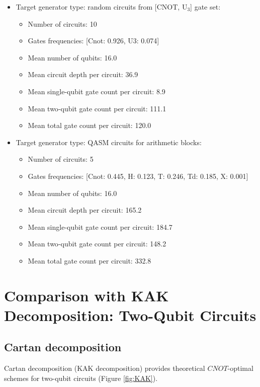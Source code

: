 \documentclass{report}%
\begin{document}
\begin{itemize}%
\item%
Target generator type: random circuits from [CNOT, U$_3$] gate set:%
\begin{itemize}%
\item%
Number of circuits: 10%
\item%
Gates frequencies: {[}Cnot: 0.926, U3: 0.074{]}%
\item%
Mean number of qubits: 16.0%
\item%
Mean circuit depth per circuit: 36.9%
\item%
Mean single{-}qubit gate count per circuit: 8.9%
\item%
Mean two{-}qubit gate count per circuit: 111.1%
\item%
Mean total gate count per circuit: 120.0%
\end{itemize}%
\end{itemize}%
\begin{itemize}%
\item%
Target generator type: QASM circuits for arithmetic blocks:%
\begin{itemize}%
\item%
Number of circuits: 5%
\item%
Gates frequencies: {[}Cnot: 0.445, H: 0.123, T: 0.246, Td: 0.185, X: 0.001{]}%
\item%
Mean number of qubits: 16.0%
\item%
Mean circuit depth per circuit: 165.2%
\item%
Mean single{-}qubit gate count per circuit: 184.7%
\item%
Mean two{-}qubit gate count per circuit: 148.2%
\item%
Mean total gate count per circuit: 332.8%
\end{itemize}%
\end{itemize}

%
\chapter{Comparison with KAK Decomposition: Two-Qubit Circuits}%
\label{chap:ComparisonwithKAKDecompositionTwo{-}QubitCircuits}%
\section{Cartan decomposition}%
\label{sec:Cartandecomposition}%
Cartan decomposition (KAK decomposition) provides theoretical
                        $CNOT$-optimal schemes for two-qubit circuits (Figure \ref{fig:KAK}).\bigskip%
\end{document}
